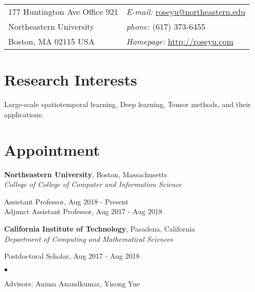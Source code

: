 \documentclass[margin,line]{res}
\newenvironment{list1}{
  \begin{list}{\ding{113}}{%
      \setlength{\itemsep}{0in}
      \setlength{\parsep}{0in} \setlength{\parskip}{0in}
      \setlength{\topsep}{0in} \setlength{\partopsep}{0in} 
      \setlength{\leftmargin}{0.17in}}}{\end{list}}
\newenvironment{list2}{
  \begin{list}{$\bullet$}{%
      \setlength{\itemsep}{0in}
      \setlength{\parsep}{0in} \setlength{\parskip}{0in}
      \setlength{\topsep}{0in} \setlength{\partopsep}{0in} 
      \setlength{\leftmargin}{0.2in}}}{\end{list}}
\begin{document}
\begin{resume}
\section{\sc }
\vspace{.05in}
\begin{tabular}{@{}p{2in}p{4in}}
177 Huntington Ave Office 921 & {\it E-mail:}  \url{roseyu@northeastern.edu } \\   
Northeastern University & {\it phone:}  (617) 373-6455 \\            
Boston, MA 02115 USA    & {\it Homepage:} \url{http://roseyu.com} \\     
\end{tabular}


\section{\sc Research Interests}
Large-scale spatiotemporal learning, Deep learning, Tensor methods, and their applications.

\section{\sc Appointment}
{\bf Northeastern University}, Boston, Massachusetts \\
{\em College of College of Computer and Information Science } 
\begin{list1}
	\item[] Assistant Professor,  Aug 2018 - Present \\
	Adjunct Assistant Professor, Aug 2017 - Aug 2018  
	\vspace*{.05in}
\end{list1}

{\bf California Institute of Technology}, Pasadena, California\\
{\em Department of Computing and Mathematical Sciences} 
\begin{list1}
	\item[] Postdoctoral Scholar,  Aug 2017 - Aug 2018
	\begin{list2}
		\vspace*{.05in}
		\item Advisors:  Anima Anandkumar, Yisong Yue
	\end{list2}
	\vspace*{.05in}
\end{list1}




\end{resume}
\end{document}
